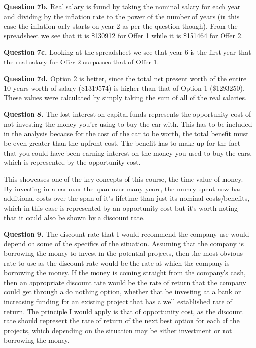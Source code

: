 \documentclass[letterpaper, reqno,11pt]{article}
\begin{document}
\medskip

{\noindent\bf Question 7b.} Real salary is found by taking the nominal salary for each year and dividing by the inflation rate to the power of the number of years (in this case the inflation only starts on year 2 as per the question though). From the spreadsheet we see that it is \$130912 for Offer 1 while it is \$151464 for Offer 2. 

\medskip

{\noindent\bf Question 7c.} Looking at the spreadsheet we see that year 6 is the first year that the real salary for Offer 2 surpasses that of Offer 1. 

\medskip

{\noindent\bf Question 7d.} Option 2 is better, since the total net present worth of the entire 10 years worth of salary (\$1319574) is higher than that of Option 1 (\$1293250). These values were calculated by simply taking the sum of all of the real salaries. 

\medskip

{\noindent\bf Question 8.} The lost interest on capital funds represents the opportunity cost of not investing the money you're using to buy the car with. This has to be included in the analysis because for the cost of the car to be worth, the total benefit must be even greater than the upfront cost. The benefit has to make up for the fact that you could have been earning interest on the money you used to buy the cars, which is represented by the opportunity cost. 

This showcases one of the key concepts of this course, the time value of money. By investing in a car over the span over many years, the money spent now has additional costs over the span of it's lifetime than just its nominal costs/benefits, which in this case is represented by an opportunity cost but it's worth noting that it could also be shown by a discount rate. 

\medskip

{\noindent\bf Question 9.} The discount rate that I would recommend the company use would depend on some of the specifics of the situation. Assuming that the company is borrowing the money to invest in the potential projects, then the most obvious rate to use as the discount rate would be the rate at which the company is borrowing the money. If the money is coming straight from the company's cash, then an appropriate discount rate would be the rate of return that the company could get through a do nothing option, whether that be investing at a bank or increasing funding for an existing project that has a well established rate of return. The principle I would apply is that of opportunity cost, as the discount rate should represent the rate of return of the next best option for each of the projects, which depending on the situation may be either investment or not borrowing the money. 
\end{document}
